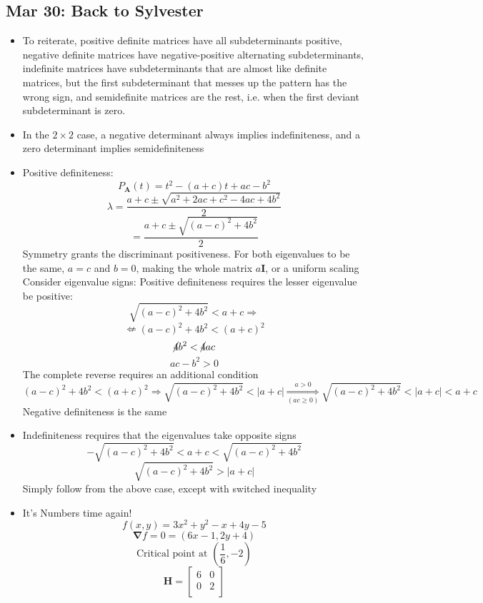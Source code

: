 \documentclass[10pt, oneside]{article}
\let\geq\geqslant
\renewcommand{\vec}[1]{\mathbf{#1}}
\newcommand{\mat}[1]{\mathbf{#1}}
\begin{document}
\subsection{Mar 30: Back to Sylvester}
\begin{itemize}
    \item To reiterate, positive definite matrices have all subdeterminants positive, negative definite matrices have negative-positive alternating subdeterminants, indefinite matrices have subdeterminants that are almost like definite matrices, but the first subdeterminant that messes up the pattern has the wrong sign, and semidefinite matrices are the rest, i.e. when the first deviant subdeterminant is zero.
    \item In the $2\times2$ case, a negative determinant always implies indefiniteness, and a zero determinant implies semidefiniteness
    \item Positive definiteness:
            \[P_\mat{A}(t) = t^2 - (a + c)t + ac - b^2\]
            \[\lambda = \frac{a+c \pm \sqrt{a^2 + 2ac + c^2 - 4ac + 4b^2}}{2}\]
            \[= \frac{a + c \pm \sqrt{(a-c)^2 + 4b^2}}{2}\]
        Symmetry grants the discriminant positiveness. For both eigenvalues to be the same, $a = c$ and $b = 0$, making the whole matrix $a\mat{I}$, or a uniform scaling\\
        Consider eigenvalue signs: Positive definiteness requires the lesser eigenvalue be positive:
            \[\sqrt{(a-c)^2 + 4b^2} < a+c \Rightarrow\]
            \[\nLeftarrow (a-c)^2 + 4b^2 < (a+c)^2\]
            \[\cancel{4}b^2 < \cancel{4}ac\]
            \[ac - b^2 > 0\]
        The complete reverse requires an additional condition
            \[(a-c)^2 + 4b^2 < (a+c)^2 \Rightarrow \sqrt{(a-c)^2 + 4b^2} < |a+c| \underset{(ac \geq 0)}{\overset{a > 0}{\Rightarrow}} \sqrt{(a-c)^2 + 4b^2} < |a+c| < a+c\]
        Negative definiteness is the same
    \item Indefiniteness requires that the eigenvalues take opposite signs
            \[-\sqrt{(a-c)^2 + 4b^2} < a+c < \sqrt{(a-c)^2 + 4b^2}\]
            \[\sqrt{(a-c)^2 + 4b^2} > |a+c|\]
        Simply follow from the above case, except with switched inequality
    \item It's Numbers time again!
        \[f(x,y) = 3x^2 + y^2 - x + 4y - 5\]
        \[\vec{\nabla} f = 0 = (6x - 1,2y + 4)\]
        \[\text{Critical point at } (\frac{1}{6},-2)\]
        \[\mat{H} = 
        \begin{bmatrix} 
        6 & 0\\
        0 & 2\\

\end{bmatrix}\]
\end{itemize}
\end{document}
